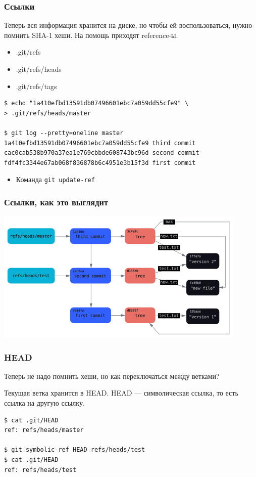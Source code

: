\documentclass{../cscslides}
\begin{document}
    \begin{frame}[fragile]
        \frametitle{Ссылки}
        Теперь вся информация хранится на диске, но чтобы ей воспользоваться, нужно помнить SHA-1 хеши. На помощь приходят reference-ы. 

        \begin{itemize}
            \item .git/refs
            \item .git/refs/heads
            \item .git/refs/tags
        \end{itemize}

        \begin{verbatim}
$ echo "1a410efbd13591db07496601ebc7a059dd55cfe9" \
> .git/refs/heads/master

$ git log --pretty=oneline master
1a410efbd13591db07496601ebc7a059dd55cfe9 third commit
cac0cab538b970a37ea1e769cbbde608743bc96d second commit
fdf4fc3344e67ab068f836878b6c4951e3b15f3d first commit
        \end{verbatim}
        \begin{itemize}
            \item Команда \verb|git update-ref|
        \end{itemize}
    \end{frame}

    \begin{frame}
        \frametitle{Ссылки, как это выглядит}
        \begin{center}
            \includegraphics[width=0.9\textwidth]{gitRefsBlack.png}
        \end{center}
    \end{frame}

    \begin{frame}[fragile]
        \frametitle{HEAD}
        Теперь не надо помнить хеши, но как переключаться между ветками?

        Текущая ветка хранится в HEAD. HEAD --- символическая ссылка, то есть ссылка на другую ссылку.
        \begin{verbatim}
$ cat .git/HEAD
ref: refs/heads/master

$ git symbolic-ref HEAD refs/heads/test
$ cat .git/HEAD
ref: refs/heads/test
        \end{verbatim}
    \end{frame}
\end{document}

